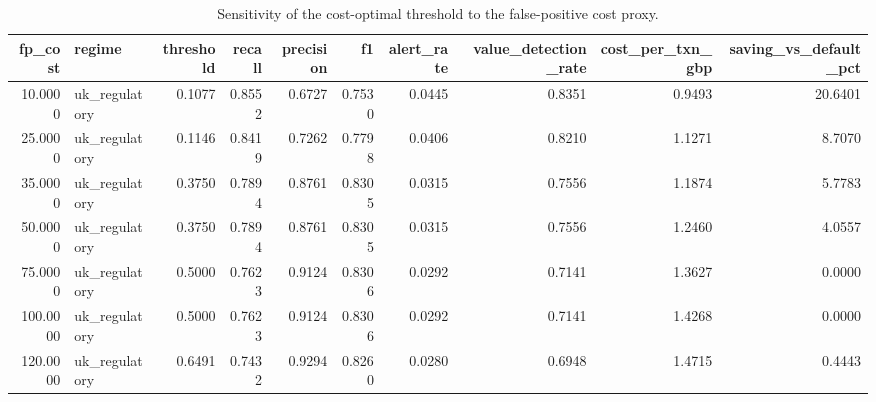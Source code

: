 \begin{table}
\caption{Sensitivity of the cost-optimal threshold to the false-positive cost proxy.}
\label{tab:table4_sensitivity_fp_cost}
\begin{tabular}{rlrrrrrrrr}
\toprule
fp\_cost & regime & threshold & recall & precision & f1 & alert\_rate & value\_detection\_rate & cost\_per\_txn\_gbp & saving\_vs\_default\_pct \\
\midrule
10.0000 & uk\_regulatory & 0.1077 & 0.8552 & 0.6727 & 0.7530 & 0.0445 & 0.8351 & 0.9493 & 20.6401 \\
25.0000 & uk\_regulatory & 0.1146 & 0.8419 & 0.7262 & 0.7798 & 0.0406 & 0.8210 & 1.1271 & 8.7070 \\
35.0000 & uk\_regulatory & 0.3750 & 0.7894 & 0.8761 & 0.8305 & 0.0315 & 0.7556 & 1.1874 & 5.7783 \\
50.0000 & uk\_regulatory & 0.3750 & 0.7894 & 0.8761 & 0.8305 & 0.0315 & 0.7556 & 1.2460 & 4.0557 \\
75.0000 & uk\_regulatory & 0.5000 & 0.7623 & 0.9124 & 0.8306 & 0.0292 & 0.7141 & 1.3627 & 0.0000 \\
100.0000 & uk\_regulatory & 0.5000 & 0.7623 & 0.9124 & 0.8306 & 0.0292 & 0.7141 & 1.4268 & 0.0000 \\
120.0000 & uk\_regulatory & 0.6491 & 0.7432 & 0.9294 & 0.8260 & 0.0280 & 0.6948 & 1.4715 & 0.4443 \\
\bottomrule
\end{tabular}
\end{table}
